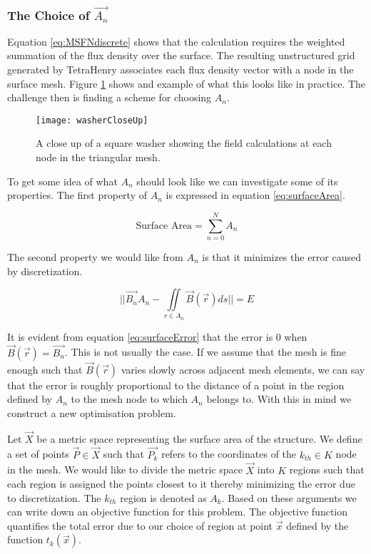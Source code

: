 
\subsubsection*{The Choice of $\Vec{A_n}$}
Equation \ref{eq:MSFNdiscrete} shows that the calculation requires the weighted summation of the flux density over the surface. The resulting unstructured grid generated by TetraHenry associates each flux density vector with a node in the surface mesh. Figure \ref{fig:washerCloseUp} shows and example of what this looks like in practice. The challenge then is finding a scheme for choosing $A_n$.

\begin{figure}[h]
    \centering
    \texttt{[image: washerCloseUp]}
    \caption{A close up of a square washer showing the field calculations at each node in the triangular mesh.}
    \label{fig:washerCloseUp}
\end{figure}
To get some idea of what $A_n$ should look like we can investigate some of its properties. The first property of $A_n$ is expressed in equation \ref{eq:surfaceArea}.

\begin{equation}
    \text{Surface Area} = \sum_{n=0}^{N}A_n
    \label{eq:surfaceArea}
\end{equation}

The second property we would like from $A_n$ is that it minimizes the error caused by discretization. 

\begin{equation}
    ||\Vec{B_n} A_n - \iint\limits_{r \in A_n}\Vec{B}(\Vec{r})ds || = E
    \label{eq:surfaceError}
\end{equation}

It is evident from equation \ref{eq:surfaceError} that the error is $0$ when $\Vec{B}(\Vec{r}) = \Vec{B_n}$. This is not usually the case. If we assume that the mesh is fine enough such that $\Vec{B}(\Vec{r})$ varies slowly across adjacent mesh elements, we can say that the error is roughly proportional to the distance of a point in the region defined by $A_n$ to the mesh node to which $A_n$ belongs to. With this in mind we construct a new optimisation problem. \par 
Let $\Vec{X}$ be a metric space representing the surface area of the structure. We define a set of points $\Vec{P} \in \Vec{X}$ such that $\Vec{P_k}$ refers to the coordinates of the $k_{th} \in K$ node in the mesh. We would like to divide the metric space $\Vec{X}$ into $K$ regions such that each region is assigned the points closest to it thereby minimizing the error due to discretization. The $k_{th}$ region is denoted as $A_k$. Based on these arguments we can write down an objective function for this problem. The objective function quantifies the total error due to our choice of region at point $\Vec{x}$ defined by the function $t_k(\Vec{x})$.

